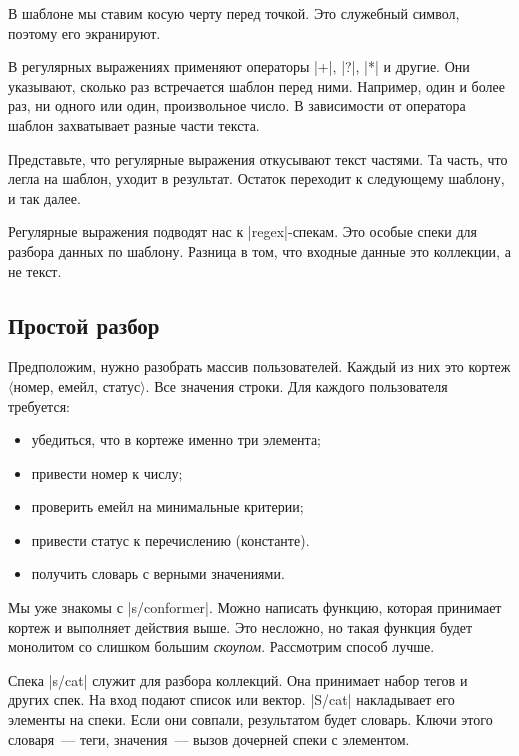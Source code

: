 В шаблоне мы ставим косую черту перед точкой. Это служебный символ, поэтому его
экранируют.

В регулярных выражениях применяют операторы \spverb|+|, \spverb|?|, \spverb|*| и
другие. Они указывают, сколько раз встречается шаблон перед ними. Например, один
и более раз, ни одного или один, произвольное число. В зависимости от оператора
шаблон захватывает разные части текста.

Представьте, что регулярные выражения откусывают текст частями. Та часть, что
легла на шаблон, уходит в результат. Остаток переходит к следующему шаблону, и
так далее.

Регулярные выражения подводят нас к \spverb|regex|-спекам. Это особые спеки для
разбора данных по шаблону. Разница в том, что входные данные это коллекции, а не
текст.

\subsection{Простой разбор}

Предположим, нужно разобрать массив пользователей. Каждый из них это кортеж
$\langle$номер, емейл, статус$\rangle$. Все значения строки. Для каждого
пользователя требуется:

\begin{itemize}

\item
  убедиться, что в кортеже именно три элемента;

\item
  привести номер к числу;

\item
  проверить емейл на минимальные критерии;

\item
  привести статус к перечислению (константе).

\item
  получить словарь с верными значениями.

\end{itemize}

Мы уже знакомы с \spverb|s/conformer|. Можно написать функцию, которая принимает
кортеж и выполняет действия выше. Это несложно, но такая функция будет монолитом
со слишком большим \emph{скоупом}. Рассмотрим способ лучше.

Спека \spverb|s/cat| служит для разбора коллекций. Она принимает набор тегов и
других спек. На вход подают список или вектор. \spverb|S/cat| накладывает его
элементы на спеки. Если они совпали, результатом будет словарь. Ключи этого
словаря~--- теги, значения~--- вызов дочерней спеки с элементом.

